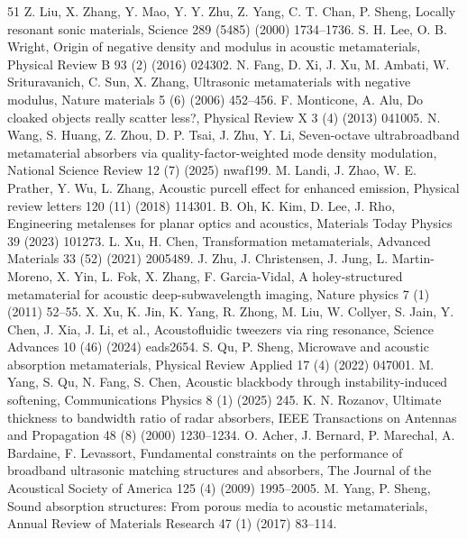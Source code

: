 \documentclass[final,5p,times,twocolumn]{elsarticle}
\begin{document}
\begin{thebibliography}{51}
	 Z. Liu, X. Zhang, Y. Mao, Y. Y. Zhu, Z. Yang, C. T. Chan, P. Sheng, Locally resonant sonic materials, Science 289 (5485) (2000) 1734--1736.
	 S. H. Lee, O. B. Wright, Origin of negative density and modulus in acoustic metamaterials, Physical Review B 93 (2) (2016) 024302.
	 N. Fang, D. Xi, J. Xu, M. Ambati, W. Srituravanich, C. Sun, X. Zhang, Ultrasonic metamaterials with negative modulus, Nature materials 5 (6) (2006) 452--456.
	 F. Monticone, A. Alu, Do cloaked objects really scatter less?, Physical Review X 3 (4) (2013) 041005.
	 N. Wang, S. Huang, Z. Zhou, D. P. Tsai, J. Zhu, Y. Li, Seven-octave ultrabroadband metamaterial absorbers via quality-factor-weighted mode density modulation, National Science Review 12 (7) (2025) nwaf199.
	 M. Landi, J. Zhao, W. E. Prather, Y. Wu, L. Zhang, Acoustic purcell effect for enhanced emission, Physical review letters 120 (11) (2018) 114301.
	 B. Oh, K. Kim, D. Lee, J. Rho, Engineering metalenses for planar optics and acoustics, Materials Today Physics 39 (2023) 101273.
	 L. Xu, H. Chen, Transformation metamaterials, Advanced Materials 33 (52) (2021) 2005489.
	 J. Zhu, J. Christensen, J. Jung, L. Martin-Moreno, X. Yin, L. Fok, X. Zhang, F. Garcia-Vidal, A holey-structured metamaterial for acoustic deep-subwavelength imaging, Nature physics 7 (1) (2011) 52--55.
	 X. Xu, K. Jin, K. Yang, R. Zhong, M. Liu, W. Collyer, S. Jain, Y. Chen, J. Xia, J. Li, et al., Acoustofluidic tweezers via ring resonance, Science Advances 10 (46) (2024) eads2654.
	 S. Qu, P. Sheng, Microwave and acoustic absorption metamaterials, Physical Review Applied 17 (4) (2022) 047001.
	 M. Yang, S. Qu, N. Fang, S. Chen, Acoustic blackbody through instability-induced softening, Communications Physics 8 (1) (2025) 245.
	 K. N. Rozanov, Ultimate thickness to bandwidth ratio of radar absorbers, IEEE Transactions on Antennas and Propagation 48 (8) (2000) 1230--1234.
	 O. Acher, J. Bernard, P. Marechal, A. Bardaine, F. Levassort, Fundamental constraints on the performance of broadband ultrasonic matching structures and absorbers, The Journal of the Acoustical Society of America 125 (4) (2009) 1995--2005.
	 M. Yang, P. Sheng, Sound absorption structures: From porous media to acoustic metamaterials, Annual Review of Materials Research 47 (1) (2017) 83--114.

\end{thebibliography}
\end{document}
